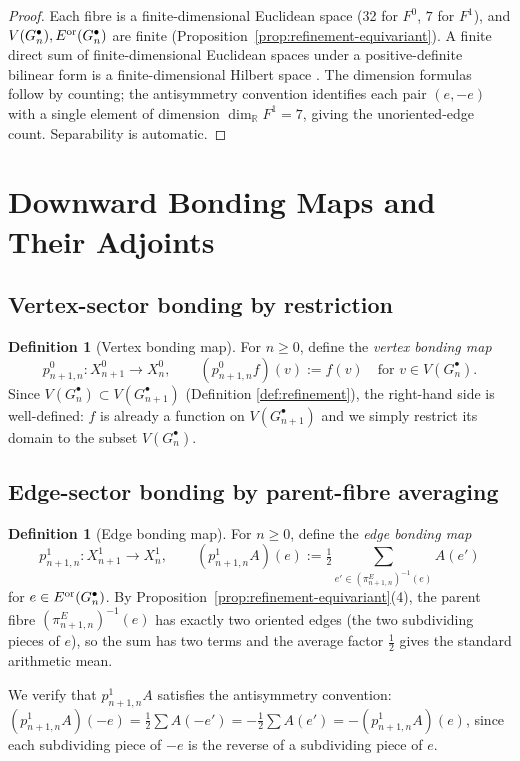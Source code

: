 \documentclass[11pt, a4paper]{amsart}
\theoremstyle{definition}
\newtheorem{definition}[theorem]{Definition}
\newcommand{\R}{\mathbb{R}}
\begin{document}
\begin{proof}
Each fibre is a finite-dimensional Euclidean space (32 for $F^0$,
$7$ for $F^1$), and $V(G_n^\bullet), E^{\rm or}(G_n^\bullet)$ are
finite (Proposition~\ref{prop:refinement-equivariant}). A finite
direct sum of finite-dimensional Euclidean spaces under a
positive-definite bilinear form is a finite-dimensional Hilbert
space \cite[Ch.~II]{ReedSimonI}. The dimension formulas follow by
counting; the antisymmetry convention identifies each pair
$(e, -e)$ with a single element of dimension $\dim_\R F^1 = 7$,
giving the unoriented-edge count.
Separability is automatic.
\end{proof}

\section{Downward Bonding Maps and Their Adjoints}
\label{sec:bonding}

\subsection{Vertex-sector bonding by restriction}

\begin{definition}[Vertex bonding map]
\label{def:p0}
For $n \geq 0$, define the \emph{vertex bonding map}
\[
  p_{n+1, n}^0 \colon X_{n+1}^0 \to X_n^0, \qquad
    (p_{n+1, n}^0 f)(v) := f(v) \quad \text{for } v \in V(G_n^
    \bullet).
\]
Since $V(G_n^\bullet) \subset V(G_{n+1}^\bullet)$ (Definition
\ref{def:refinement}), the right-hand side is well-defined: $f$ is
already a function on $V(G_{n+1}^\bullet)$ and we simply restrict
its domain to the subset $V(G_n^\bullet)$.
\end{definition}

\subsection{Edge-sector bonding by parent-fibre averaging}

\begin{definition}[Edge bonding map]
\label{def:p1}
For $n \geq 0$, define the \emph{edge bonding map}
\[
  p_{n+1, n}^1 \colon X_{n+1}^1 \to X_n^1, \qquad
    (p_{n+1, n}^1 A)(e) := \tfrac{1}{2} \sum_{e' \in (\pi_{n+1, n}^E)^{-1}(e)}
    A(e')
\]
for $e \in E^{\rm or}(G_n^\bullet)$. By
Proposition~\ref{prop:refinement-equivariant}(4), the parent fibre
$(\pi_{n+1, n}^E)^{-1}(e)$ has exactly two oriented edges (the two
subdividing pieces of $e$), so the sum has two terms and the average
factor $\tfrac{1}{2}$ gives the standard arithmetic mean.

We verify that $p_{n+1, n}^1 A$ satisfies the antisymmetry
convention: $(p_{n+1, n}^1 A)(-e) = \tfrac{1}{2} \sum A(-e') =
-\tfrac{1}{2} \sum A(e') = -(p_{n+1, n}^1 A)(e)$, since each
subdividing piece of $-e$ is the reverse of a subdividing piece of
$e$.
\end{definition}
\end{document}
